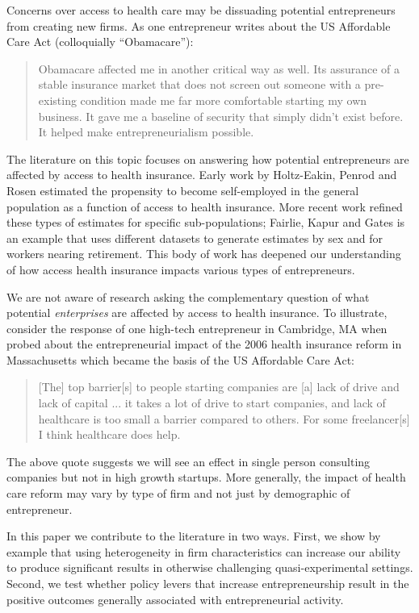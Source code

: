 \documentclass[12pt]{article}
\begin{document}
Concerns over access to health care may be dissuading potential entrepreneurs from creating new firms. As one entrepreneur writes about the US Affordable Care Act (colloquially ``Obamacare''):
\begin{quote}
Obamacare affected me in another critical way as well. Its assurance of a stable insurance market that does not screen out someone with a pre-existing condition made me far more comfortable starting my own business. It gave me a baseline of security that simply didn't exist before. It helped make entrepreneurialism possible. \citep{sullivan2014}
\end{quote}

The literature on this topic focuses on answering how potential entrepreneurs are affected by access to health insurance. Early work by Holtz-Eakin, Penrod and Rosen \citep{holtz1996health} estimated the propensity to become self-employed in the general population as a function of access to health insurance. More recent work refined these types of estimates for specific sub-populations; Fairlie, Kapur and Gates \citep{fairlie2011employer} is an example that uses different datasets to generate estimates by sex and for workers nearing retirement. This body of work has deepened our understanding of how access health insurance impacts various types of entrepreneurs. 

We are not aware of research asking the complementary question of what potential \emph{enterprises} are affected by access to health insurance. To illustrate, consider the response of one high-tech entrepreneur in Cambridge, MA when probed about the entrepreneurial impact of the 2006 health insurance reform in Massachusetts which became the basis of the US Affordable Care Act:
\begin{quote}
[The] top barrier[s] to people starting companies are [a] lack of drive and lack of capital ... it takes a lot of drive to start companies, and lack of healthcare is too small a barrier compared to others. For some freelancer[s] I think healthcare does help.
\end{quote}
The above quote suggests we will see an effect in single person consulting companies but not in high growth startups. More generally, the impact of health care reform may vary by type of firm and not just by demographic of entrepreneur. 

In this paper we contribute to the literature in two ways. First, we show by example that using heterogeneity in firm characteristics can increase our ability to produce significant results in otherwise challenging quasi-experimental settings. Second, we test whether policy levers that increase entrepreneurship result in the positive outcomes generally associated with entrepreneurial activity. 
\end{document}
